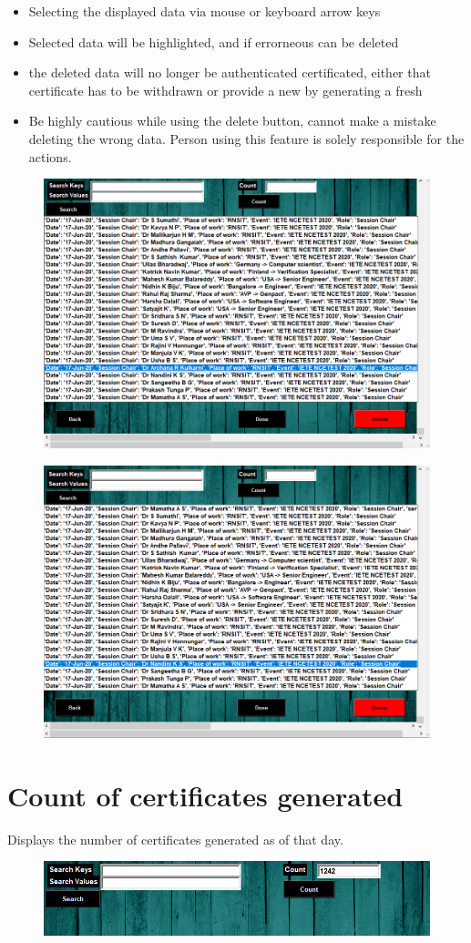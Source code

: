 \begin{itemize}
	\item Selecting the displayed data via mouse or keyboard arrow keys
	\item Selected data will be highlighted, and if errorneous can be deleted
	\item the deleted data will no longer be authenticated certificated, either that certificate has to be withdrawn or provide a new by generating a fresh
	\item Be highly cautious while using the delete button, cannot make a mistake deleting the wrong data. Person using this feature is solely responsible for the actions.
\end{itemize}

\begin{figure}[H]
	\centering
	\includegraphics[width=0.75\linewidth]{"images/generation_qr_nqr/Screenshot (72)"}
	\label{fig:screenshot-72}
\end{figure}

\begin{figure}[H]
	\centering
	\includegraphics[width=0.75\linewidth]{"images/generation_qr_nqr/Screenshot (73)"}
	\label{fig:screenshot-73}
\end{figure}




\section{Count of certificates generated}

Displays the number of certificates generated as of that day.

\begin{figure}[H]
	\centering
	\includegraphics[width=0.9\linewidth]{"images/generation_qr_nqr/Screenshot (74)"}
	\label{fig:screenshot-74}
\end{figure}

